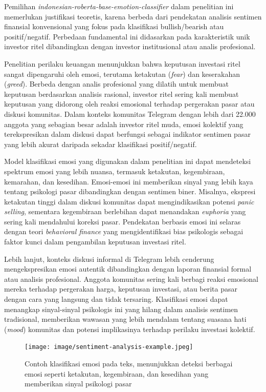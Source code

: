 Pemilihan \textit{indonesian-roberta-base-emotion-classifier} dalam penelitian ini memerlukan justifikasi teoretis, karena berbeda dari pendekatan analisis sentimen finansial konvensional yang fokus pada klasifikasi bullish/bearish atau positif/negatif. Perbedaan fundamental ini didasarkan pada karakteristik unik investor ritel dibandingkan dengan investor institusional atau analis profesional.

Penelitian perilaku keuangan menunjukkan bahwa keputusan investasi ritel sangat dipengaruhi oleh emosi, terutama ketakutan (\textit{fear}) dan keserakahan (\textit{greed}). Berbeda dengan analis profesional yang dilatih untuk membuat keputusan berdasarkan analisis rasional, investor ritel sering kali membuat keputusan yang didorong oleh reaksi emosional terhadap pergerakan pasar atau diskusi komunitas. Dalam konteks komunitas Telegram dengan lebih dari 22.000 anggota yang sebagian besar adalah investor ritel muda, emosi kolektif yang terekspresikan dalam diskusi dapat berfungsi sebagai indikator sentimen pasar yang lebih akurat daripada sekadar klasifikasi positif/negatif.

Model klasifikasi emosi yang digunakan dalam penelitian ini dapat mendeteksi spektrum emosi yang lebih nuansa, termasuk ketakutan, kegembiraan, kemarahan, dan kesedihan. Emosi-emosi ini memberikan sinyal yang lebih kaya tentang psikologi pasar dibandingkan dengan sentimen biner. Misalnya, ekspresi ketakutan tinggi dalam diskusi komunitas dapat mengindikasikan potensi \textit{panic selling}, sementara kegembiraan berlebihan dapat menandakan \textit{euphoria} yang sering kali mendahului koreksi pasar. Pendekatan berbasis emosi ini selaras dengan teori \textit{behavioral finance} yang mengidentifikasi bias psikologis sebagai faktor kunci dalam pengambilan keputusan investasi ritel.

Lebih lanjut, konteks diskusi informal di Telegram lebih cenderung mengekspresikan emosi autentik dibandingkan dengan laporan finansial formal atau analisis profesional. Anggota komunitas sering kali berbagi reaksi emosional mereka terhadap pergerakan harga, keputusan investasi, atau berita pasar dengan cara yang langsung dan tidak tersaring. Klasifikasi emosi dapat menangkap sinyal-sinyal psikologis ini yang hilang dalam analisis sentimen tradisional, memberikan wawasan yang lebih mendalam tentang suasana hati (\textit{mood}) komunitas dan potensi implikasinya terhadap perilaku investasi kolektif.

\begin{figure}[H]
  \centering
  \texttt{[image: image/sentiment-analysis-example.jpeg]}
  \caption{Contoh klasifikasi emosi pada teks, menunjukkan deteksi berbagai emosi seperti ketakutan, kegembiraan, dan kesedihan yang memberikan sinyal psikologi pasar}
  \label{fig:sentiment-example}
\end{figure}

